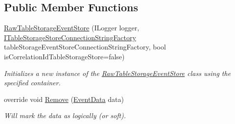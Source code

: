 \subsection*{Public Member Functions}
\begin{DoxyCompactItemize}
\item 
\hyperlink{classCqrs_1_1Azure_1_1BlobStorage_1_1Events_1_1TableStorageEventStore_1_1RawTableStorageEventStore_aa6aa02462732467a16148e0d094cd308_aa6aa02462732467a16148e0d094cd308}{Raw\+Table\+Storage\+Event\+Store} (I\+Logger logger, \hyperlink{interfaceCqrs_1_1Azure_1_1BlobStorage_1_1ITableStorageStoreConnectionStringFactory}{I\+Table\+Storage\+Store\+Connection\+String\+Factory} table\+Storage\+Event\+Store\+Connection\+String\+Factory, bool is\+Correlation\+Id\+Table\+Storage\+Store=false)
\begin{DoxyCompactList}\small\item\em Initializes a new instance of the \hyperlink{classCqrs_1_1Azure_1_1BlobStorage_1_1Events_1_1TableStorageEventStore_1_1RawTableStorageEventStore}{Raw\+Table\+Storage\+Event\+Store} class using the specified container. \end{DoxyCompactList}\item 
override void \hyperlink{classCqrs_1_1Azure_1_1BlobStorage_1_1Events_1_1TableStorageEventStore_1_1RawTableStorageEventStore_a0c71f309e7ec1a349f4862c7021661de_a0c71f309e7ec1a349f4862c7021661de}{Remove} (\hyperlink{classCqrs_1_1Events_1_1EventData}{Event\+Data} data)
\begin{DoxyCompactList}\small\item\em Will mark the {\itshape data}  as logically (or soft). \end{DoxyCompactList}\end{DoxyCompactItemize}
